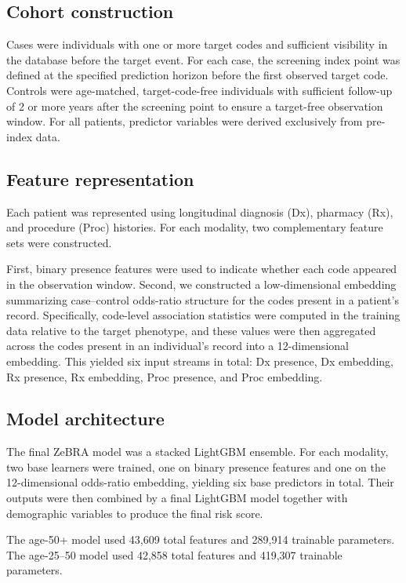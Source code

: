\documentclass[onecolumn, compsoc,11pt]{IEEEtran}
\begin{document}
\subsection*{Cohort construction}

Cases were individuals with one or more target codes and sufficient visibility in the database before the target event.
For each case, the screening index point was defined at the specified prediction horizon before the first observed target code.
Controls were age-matched, target-code-free individuals with sufficient follow-up of 2 or more years after the screening point to ensure a target-free observation window. For all patients, predictor variables were derived exclusively from pre-index data.

\subsection*{Feature representation}

Each patient was represented using longitudinal diagnosis (Dx), pharmacy (Rx), and procedure (Proc) histories. For each modality, two complementary feature sets were constructed.

First, binary presence features were used to indicate whether each code appeared in the observation window. Second, we constructed a low-dimensional embedding summarizing case--control odds-ratio structure for the codes present in a patient's record. Specifically, code-level association statistics were computed in the training data relative to the target phenotype, and these values were then aggregated across the codes present in an individual's record into a 12-dimensional embedding. This yielded six input streams in total: Dx presence, Dx embedding, Rx presence, Rx embedding, Proc presence, and Proc embedding.

\subsection*{Model architecture}

The final ZeBRA model was a stacked LightGBM ensemble. For each modality, two base learners were trained, one on binary presence features and one on the 12-dimensional odds-ratio embedding, yielding six base predictors in total. Their outputs were then combined by a final LightGBM model together with demographic variables to produce the final risk score.

The age-50+ model used 43,609 total features and 289,914 trainable parameters. The age-25--50 model used 42,858 total features and 419,307 trainable parameters.
\end{document}

